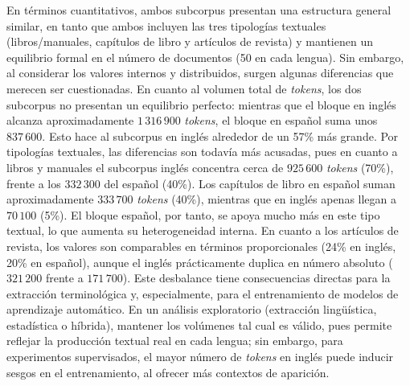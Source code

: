 En términos cuantitativos, ambos subcorpus presentan una estructura general similar, en tanto que ambos incluyen las tres tipologías textuales (libros/manuales, capítulos de libro y artículos de revista) y mantienen un equilibrio formal en el número de documentos (50 en cada lengua). Sin embargo, al considerar los valores internos y distribuidos, surgen algunas diferencias que merecen ser cuestionadas. En cuanto al volumen total de \textit{tokens}, los dos subcorpus no presentan un equilibrio perfecto: mientras que el bloque en inglés alcanza aproximadamente $1\,316\,900$ \textit{tokens}, el bloque en español suma unos $837\,600$. Esto hace al subcorpus en inglés alrededor de un 57\% más grande. Por tipologías textuales, las diferencias son todavía más acusadas, pues en cuanto a libros y manuales el subcorpus inglés concentra cerca de $925\,600$ \textit{tokens} (70\%), frente a los $332\,300$ del español (40\%). Los capítulos de libro en español suman aproximadamente $333\,700$ \textit{tokens} (40\%), mientras que en inglés apenas llegan a $70\,100$ (5\%). El bloque español, por tanto, se apoya mucho más en este tipo textual, lo que aumenta su heterogeneidad interna. En cuanto a los artículos de revista, los valores son comparables en términos proporcionales (24\% en inglés, 20\% en español), aunque el inglés prácticamente duplica en número absoluto ($321\,200$ frente a $171\,700$). Este desbalance tiene consecuencias directas para la extracción terminológica y, especialmente, para el entrenamiento de modelos de aprendizaje automático. En un análisis exploratorio (extracción lingüística, estadística o híbrida), mantener los volúmenes tal cual es válido, pues permite reflejar la producción textual real en cada lengua; sin embargo, para experimentos supervisados, el mayor número de \textit{tokens} en inglés puede inducir sesgos en el entrenamiento, al ofrecer más contextos de aparición. 

